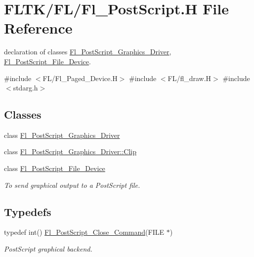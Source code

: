 \hypertarget{_fl___post_script_8_h}{}\section{F\+L\+T\+K/\+F\+L/\+Fl\+\_\+\+Post\+Script.H File Reference}
\label{_fl___post_script_8_h}


declaration of classes \hyperlink{class_fl___post_script___graphics___driver}{Fl\+\_\+\+Post\+Script\+\_\+\+Graphics\+\_\+\+Driver}, \hyperlink{class_fl___post_script___file___device}{Fl\+\_\+\+Post\+Script\+\_\+\+File\+\_\+\+Device}.  


{\ttfamily \#include $<$F\+L/\+Fl\+\_\+\+Paged\+\_\+\+Device.\+H$>$}\newline
{\ttfamily \#include $<$F\+L/fl\+\_\+draw.\+H$>$}\newline
{\ttfamily \#include $<$stdarg.\+h$>$}\newline
\subsection*{Classes}
\begin{DoxyCompactItemize}
\item 
class \hyperlink{class_fl___post_script___graphics___driver}{Fl\+\_\+\+Post\+Script\+\_\+\+Graphics\+\_\+\+Driver}
\item 
class \hyperlink{class_fl___post_script___graphics___driver_1_1_clip}{Fl\+\_\+\+Post\+Script\+\_\+\+Graphics\+\_\+\+Driver\+::\+Clip}
\item 
class \hyperlink{class_fl___post_script___file___device}{Fl\+\_\+\+Post\+Script\+\_\+\+File\+\_\+\+Device}
\begin{DoxyCompactList}\small\item\em To send graphical output to a Post\+Script file. \end{DoxyCompactList}\end{DoxyCompactItemize}
\subsection*{Typedefs}
\begin{DoxyCompactItemize}
\item 
typedef int() \hyperlink{_fl___post_script_8_h_ab7cbc3517e5261c856e1030514358fe7}{Fl\+\_\+\+Post\+Script\+\_\+\+Close\+\_\+\+Command}(F\+I\+LE $\ast$)
\begin{DoxyCompactList}\small\item\em Post\+Script graphical backend. \end{DoxyCompactList}\end{DoxyCompactItemize}


